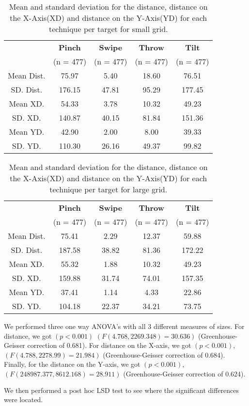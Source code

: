 \begin{table}[H]
	\centering
	\begin{tabular}{|c|c|c|c|c|}
		\hline
		\rowcolor[HTML]{9B9B9B} 
		& \textbf{Pinch} & \textbf{Swipe} & \textbf{Throw} & \textbf{Tilt} \\
		\rowcolor[HTML]{9B9B9B} 
		& (n = 477) & (n = 477) & (n = 477) & (n = 477) \\ \hline
		Mean Dist. & 75.97 & 5.40 & 18.60          & 76.51         \\ \hline
		SD. Dist. & 176.15 & 47.81 & 95.29 & 177.45 \\ \hline
		Mean XD. & 54.33 & 3.78 & 10.32 & 49.23 \\ \hline
		SD. XD. & 140.87 & 40.15 & 81.84 & 151.36 \\ \hline
		Mean YD. & 42.90 & 2.00 & 8.00 & 39.33 \\ \hline
		SD. YD. & 110.30 & 26.16 & 49.37 & 99.82 \\ \hline
	\end{tabular}
	\caption{Mean and standard deviation for the distance, distance on the X-Axis(XD) and distance on the Y-Axis(YD) for each technique per target for small grid.}
	\label{tab:distanceSmall}
\end{table}

\begin{table}[H]
	\centering
	\begin{tabular}{|c|c|c|c|c|}
		\hline
		\rowcolor[HTML]{9B9B9B} 
		& \textbf{Pinch} & \textbf{Swipe} & \textbf{Throw} & \textbf{Tilt} \\
		\rowcolor[HTML]{9B9B9B} 
		& (n = 477) & (n = 477) & (n = 477) & (n = 477) \\ \hline
		Mean Dist. & 75.41 & 2.29 & 12.37 & 59.88         \\ \hline
		SD. Dist. & 187.58 & 38.82 & 81.36 & 172.22 \\ \hline
		Mean XD. & 55.32 & 1.88 & 10.32 & 49.23 \\ \hline
		SD. XD. & 159.88 & 31.74 & 74.01 & 157.35 \\ \hline
		Mean YD. & 37.41 & 1.14 & 4.33 & 22.86 \\ \hline
		SD. YD. & 104.18 & 22.37 & 34.21 & 73.75 \\ \hline
	\end{tabular}
	\caption{Mean and standard deviation for the distance, distance on the X-Axis(XD) and distance on the Y-Axis(YD) for each technique per target for large grid.}
	\label{tab:distanceLarge}
\end{table} 

We performed three one way ANOVA's with all 3 different measures of sizes.
For distance, we got $(p<0.001)$ $(F(4.768, 2269.348) = 30.636)$ (Greenhouse-Geisser correction of 0.681).
For distance on the X-axis, we got $(p<0.001)$, $(F(4.788,2278.99) = 21.984)$ (Greenhouse-Geisser correction of 0.684).
Finally, for the distance on the Y-axis, we got $(p<0.001)$, $(F(248987.377, 8612.168)=28.911)$ (Greenhouse-Geisser correction of 0.624).

We then performed a post hoc LSD test to see where the significant differences were located. 
